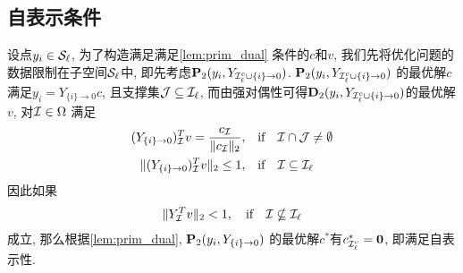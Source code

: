 \subsection{自表示条件}
设点$y_i\in\mathcal{S}_\ell$, 为了构造满足满足\autoref{lem:prim_dual} 条件的$c$和$v$,
我们先将优化问题的数据限制在子空间$\mathcal{S}_\ell$中,
即先考虑$\mathbf{P}_2(y_i, Y_{\mathcal{I}_\ell^c\cup \{i\}\rightarrow 0})$.
$\mathbf{P}_2(y_i, Y_{\mathcal{I}_\ell^c\cup \{i\}\rightarrow 0})$
的最优解$c$满足$y_i=Y_{\{i\}\rightarrow 0}c$, 且支撑集$\mathcal{J} \subseteq \mathcal{I}_\ell$,
而由强对偶性可得$\mathbf{D}_2(y_i, Y_{\mathcal{I}_\ell^c\cup \{i\}\rightarrow 0})$的最优解$v$,
对$ \mathcal{I}\in \Omega$ 满足
\begin{align*}
  (Y_{\{i\}\rightarrow 0})^T_{\mathcal{I}} v = \frac{c_{\mathcal{I}}}{\|c_{\mathcal{I}}\|_2}, \quad&
  \text{if}\quad\mathcal{I} \cap \mathcal{J} \neq \emptyset \\
  \|(Y_{\{i\}\rightarrow 0})^T_{\mathcal{I}} v\|_2 \le 1, \quad&
  \text{if} \quad \mathcal{I} \subseteq \mathcal{I}_\ell 
\end{align*}
因此如果
\begin{equation} \label{eq:group_cond1}
  \|Y_{\mathcal{I}}^T v\|_2<1, \quad \text{if} \quad\mathcal{I} \nsubseteq \mathcal{I}_\ell
\end{equation}
成立, 那么根据\autoref{lem:prim_dual},  $\mathbf{P}_2(y_i, Y_{\{i\}\rightarrow 0})$
的最优解$c^*$有$c^*_{\mathcal{I}_\ell^c}=\mathbf{0}$, 即满足自表示性.


